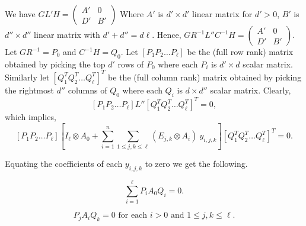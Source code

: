  We have $G L' H = \left(
\begin{array}{c|c}
A' & 0 \\
\hline
D' & B'
\end{array}
\right)$
Where $A'$ is $d' \times d'$ linear matrix for $d'>0$, $B'$ is $d''
\times d''$ linear matrix with $d' + d'' = d \ell$. Hence, $GR^{-1}
L''C^{-1} H = \left(
\begin{array}{c|c}
A' & 0 \\
\hline
D' & B'
\end{array}
\right)$.  Let $GR^{-1}=P_0$ and $C^{-1}H=Q_0$. Let $[ P_1 P_2 \ldots
  P_\ell]$ be the (full row rank) matrix obtained by picking the top
$d'$ rows of $P_0$ where each $P_i$ is $d' \times d$ scalar
matrix. Similarly let $[ Q_1^T Q_2^T \ldots Q_\ell^T]^T$ be the (full column
rank) matrix obtained by picking the rightmost $d''$ columns of $Q_0$
where each $Q_i$ is $d \times d''$ scalar matrix. Clearly,
\[   [ P_1 P_2 \ldots P_\ell] L'' [ Q_1^T Q_2^T \ldots Q_\ell^T]^T = 0, \]
which implies,
\[   [ P_1 P_2 \ldots P_\ell]\left[ I_\ell \otimes A_0 + \sum_{i=1}^n \sum_{1 \leq j, k \leq \ell} (E_{j,k} \otimes A_i)~ y_{i,j,k} \right] [ Q_1^T Q_2^T \ldots Q_\ell^T]^T = 0. \]

Equating the coefficients of each $y_{i,j,k}$ to zero we get the following.

\begin{equation} \label{eqn-A0}
\sum _{i=1}^\ell P_i A_0 Q_i = 0.
\end{equation} 

\begin{equation} \label{eqn-An0}
P_j A_i Q_k =0 \textrm{ for each } i>0 \textrm { and } 1\leq j,k \leq
\ell.
\end{equation} 

